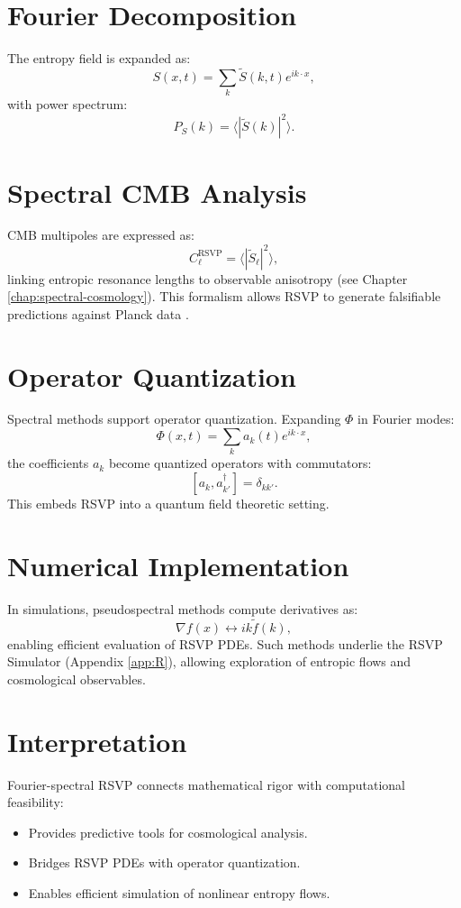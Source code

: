 \documentclass[12pt]{report}
\begin{document}
\section{Fourier Decomposition}
The entropy field is expanded as:
\begin{equation}
S(x,t) = \sum_{k} \tilde{S}(k,t) e^{i k \cdot x}, \label{eq:entropy-fourier}
\end{equation}
with power spectrum:
\begin{equation}
P_S(k) = \langle |\tilde{S}(k)|^2 \rangle.
\end{equation}

\section{Spectral CMB Analysis}
CMB multipoles are expressed as:
\begin{equation}
C_\ell^{\text{RSVP}} = \langle |\tilde{S}_\ell|^2 \rangle, \label{eq:spectrum}
\end{equation}
linking entropic resonance lengths to observable anisotropy (see Chapter \ref{chap:spectral-cosmology}). This formalism allows RSVP to generate falsifiable predictions against Planck data \citep{Planck2020}.

\section{Operator Quantization}
Spectral methods support operator quantization. Expanding \(\Phi\) in Fourier modes:
\[
\Phi(x,t) = \sum_k a_k(t) e^{i k \cdot x},
\]
the coefficients \(a_k\) become quantized operators with commutators:
\[
[a_k, a^\dagger_{k'}] = \delta_{kk'}.
\]
This embeds RSVP into a quantum field theoretic setting.

\section{Numerical Implementation}
In simulations, pseudospectral methods compute derivatives as:
\[
\nabla f(x) \leftrightarrow i k \tilde{f}(k),
\]
enabling efficient evaluation of RSVP PDEs. Such methods underlie the RSVP Simulator (Appendix \ref{app:R}), allowing exploration of entropic flows and cosmological observables.

\section{Interpretation}
Fourier-spectral RSVP connects mathematical rigor with computational feasibility:
\begin{itemize}
    \item Provides predictive tools for cosmological analysis.
    \item Bridges RSVP PDEs with operator quantization.
    \item Enables efficient simulation of nonlinear entropy flows.
\end{itemize}
\end{document}
